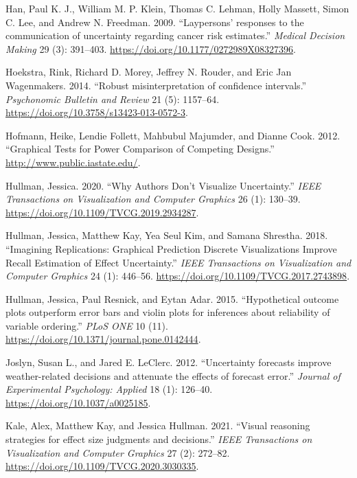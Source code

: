 \documentclass[
  letterpaper,
  DIV=11,
  numbers=noendperiod]{scrartcl}
\newlength{\cslhangindent}
\newlength{\cslentryspacingunit} %
\newenvironment{CSLReferences}[2] %
 {%
  \setlength{\parindent}{0pt}
  \ifodd #1
  \let\oldpar\par
  \def\par{\hangindent=\cslhangindent\oldpar}
  \fi
  \setlength{\parskip}{#2\cslentryspacingunit}
 }%
 {}
\begin{document}
\begin{CSLReferences}{1}{0}
\leavevmode{}%
Han, Paul K. J., William M. P. Klein, Thomas C. Lehman, Holly Massett,
Simon C. Lee, and Andrew N. Freedman. 2009. {``{Laypersons' responses to
the communication of uncertainty regarding cancer risk estimates}.''}
\emph{Medical Decision Making} 29 (3): 391--403.
\url{https://doi.org/10.1177/0272989X08327396}.

\leavevmode{}%
Hoekstra, Rink, Richard D. Morey, Jeffrey N. Rouder, and Eric Jan
Wagenmakers. 2014. {``{Robust misinterpretation of confidence
intervals}.''} \emph{Psychonomic Bulletin and Review} 21 (5): 1157--64.
\url{https://doi.org/10.3758/s13423-013-0572-3}.

\leavevmode{}%
Hofmann, Heike, Lendie Follett, Mahbubul Majumder, and Dianne Cook.
2012. {``{Graphical Tests for Power Comparison of Competing Designs}.''}
\url{http://www.public.iastate.edu/}.

\leavevmode{}%
Hullman, Jessica. 2020. {``{Why Authors Don't Visualize Uncertainty}.''}
\emph{IEEE Transactions on Visualization and Computer Graphics} 26 (1):
130--39. \url{https://doi.org/10.1109/TVCG.2019.2934287}.

\leavevmode{}%
Hullman, Jessica, Matthew Kay, Yea Seul Kim, and Samana Shrestha. 2018.
{``{Imagining Replications: Graphical Prediction Discrete Visualizations
Improve Recall Estimation of Effect Uncertainty}.''} \emph{IEEE
Transactions on Visualization and Computer Graphics} 24 (1): 446--56.
\url{https://doi.org/10.1109/TVCG.2017.2743898}.

\leavevmode{}%
Hullman, Jessica, Paul Resnick, and Eytan Adar. 2015. {``{Hypothetical
outcome plots outperform error bars and violin plots for inferences
about reliability of variable ordering}.''} \emph{PLoS ONE} 10 (11).
\url{https://doi.org/10.1371/journal.pone.0142444}.

\leavevmode{}%
Joslyn, Susan L., and Jared E. LeClerc. 2012. {``{Uncertainty forecasts
improve weather-related decisions and attenuate the effects of forecast
error}.''} \emph{Journal of Experimental Psychology: Applied} 18 (1):
126--40. \url{https://doi.org/10.1037/a0025185}.

\leavevmode{}%
Kale, Alex, Matthew Kay, and Jessica Hullman. 2021. {``{Visual reasoning
strategies for effect size judgments and decisions}.''} \emph{IEEE
Transactions on Visualization and Computer Graphics} 27 (2): 272--82.
\url{https://doi.org/10.1109/TVCG.2020.3030335}.


\end{CSLReferences}
\end{document}
